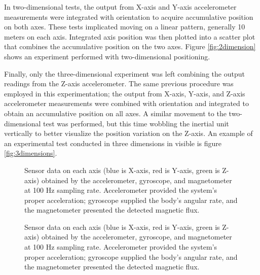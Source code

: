 In two-dimensional tests, the output from X-axis and Y-axis accelerometer measurements were integrated with orientation to acquire accumulative position on both axes. These tests implicated moving on a linear pattern, generally 10 meters on each axis. Integrated axis position was then plotted into a scatter plot that combines the accumulative position on the two axes. Figure \ref{fig:2dimension} shows an experiment performed with two-dimensional positioning.

Finally, only the three-dimensional experiment was left combining the output readings from the Z-axis accelerometer. The same previous procedure was employed in this experimentation; the output from X-axis, Y-axis, and Z-axis accelerometer measurements were combined with orientation and integrated to obtain an accumulative position on all axes. A similar movement to the two-dimensional test was performed, but this time wobbling the inertial unit vertically to better visualize the position variation on the Z-axis. An example of an experimental test conducted in three dimensions in visible is figure \ref{fig:3dimensions}.

\begin{figure}
    \centering
    \resizebox{1\linewidth}{!}{}
    \caption{Sensor data on each axis (blue is X-axis, red is Y-axis, green is Z-axis) obtained by the accelerometer, gyroscope, and magnetometer at 100 Hz sampling rate. Accelerometer provided the system's proper acceleration; gyroscope supplied the body's angular rate, and the magnetometer presented the detected magnetic flux.}
    \label{fig:triangle3D}
\end{figure}

\begin{figure}
    \centering
    \resizebox{1\linewidth}{!}{}
    \caption{Sensor data on each axis (blue is X-axis, red is Y-axis, green is Z-axis) obtained by the accelerometer, gyroscope, and magnetometer at 100 Hz sampling rate. Accelerometer provided the system's proper acceleration; gyroscope supplied the body's angular rate, and the magnetometer presented the detected magnetic flux.}
    \label{fig:square3D}
\end{figure}
